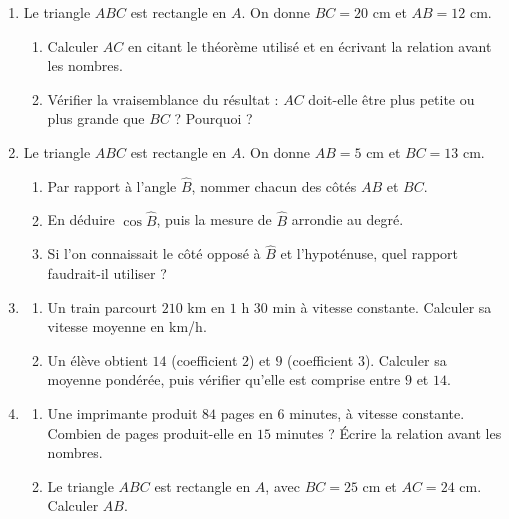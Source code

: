 \documentclass[10pt,a4paper]{article}
\begin{document}
\begin{enumerate}
\needspace{22mm}
\item[\textbf{B1.}] Le triangle $ABC$ est rectangle en $A$. On donne $BC = 20$ cm et $AB = 12$ cm.
\begin{enumerate}
\item Calculer $AC$ en citant le théorème utilisé et en écrivant la relation avant les nombres.
\item Vérifier la vraisemblance du résultat : $AC$ doit-elle être plus petite ou plus grande que $BC$ ? Pourquoi ?
\end{enumerate}
\par\vspace{1.2mm}
\needspace{22mm}
\item[\textbf{B2.}] Le triangle $ABC$ est rectangle en $A$. On donne $AB = 5$ cm et $BC = 13$ cm.
\begin{enumerate}
\item Par rapport à l'angle $\widehat{B}$, nommer chacun des côtés $AB$ et $BC$.
\item En déduire $\cos\widehat{B}$, puis la mesure de $\widehat{B}$ arrondie au degré.
\item Si l'on connaissait le côté opposé à $\widehat{B}$ et l'hypoténuse, quel rapport faudrait-il utiliser ?
\end{enumerate}
\par\vspace{1.2mm}
\needspace{22mm}
\item[\textbf{B3.}] \begin{enumerate}
\item Un train parcourt $210$ km en $1$ h $30$ min à vitesse constante. Calculer sa vitesse moyenne en km/h.
\item Un élève obtient $14$ (coefficient $2$) et $9$ (coefficient $3$). Calculer sa moyenne pondérée, puis vérifier
qu'elle est comprise entre $9$ et $14$.
\end{enumerate}
\par\vspace{1.2mm}
\needspace{22mm}
\item[\textbf{B4.}] \begin{enumerate}
\item Une imprimante produit $84$ pages en $6$ minutes, à vitesse constante.
Combien de pages produit-elle en $15$ minutes ? Écrire la relation avant les nombres.
\item Le triangle $ABC$ est rectangle en $A$, avec $BC = 25$ cm et $AC = 24$ cm. Calculer $AB$.
\end{enumerate}
\par\vspace{1.2mm}
\end{enumerate}
\end{document}
